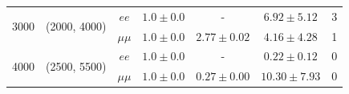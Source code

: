 \documentclass[12pt,a4paper]{amsart}
\begin{document}
\begin{table}[]
\begin{tabular}{ccc|cccc}
\multirow{2}{*}{3000}                                         & \multirow{2}{*}{(2000, 4000)}                                        & $ee$     & $1.0\pm 0.0$        & -                   & $6.92\pm 5.12$    & 3         \\
                                                              &                                                                      & $\mu\mu$ & $1.0\pm 0.0$        & $2.77\pm 0.02$      & $4.16\pm 4.28$    & 1         \\ \hline
\multirow{2}{*}{4000}                                         & \multirow{2}{*}{(2500, 5500)}                                        & $ee$     & $1.0\pm 0.0$        & -                   & $0.22\pm 0.12$    & 0         \\
                                                              &                                                                      & $\mu\mu$ & $1.0\pm 0.0$        & $0.27\pm0.00$       & $10.30\pm 7.93$   & 0     \\ \hline\hline
\end{tabular}
\end{table}
\end{document}
